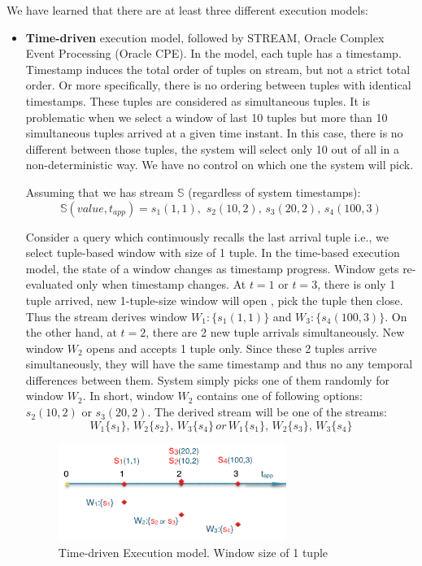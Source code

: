 We have learned that there are at least three different execution models:
\begin{itemize}
	\item \textbf{Time-driven} execution model, followed by STREAM, Oracle Complex Event Processing (Oracle CPE). In the model, each tuple has a timestamp. Timestamp induces the total order of tuples on stream, but not a strict total order. Or more specifically, there is no ordering between tuples with identical timestamps. These tuples are considered as simultaneous tuples. It is problematic when we select a window of last 10 tuples but more than 10 simultaneous tuples arrived at a given time instant. In this case, there is no different between those tuples, the system will select only 10 out of all in a non-deterministic way. We have no control on which one the system will pick.
	
Assuming that we has stream $\mathbb{S}$ (regardless of system timestamps): 
	\begin{equation}
			\mathbb{S}(value, t_{app}) = s_1(1,1),\,\,s_2(10,2),\,s_3(20,2),\, s_4(100,3)
	\end{equation}
	
	
Consider a query which continuously recalls the last arrival tuple i.e., we select tuple-based window with size of 1 tuple. In the time-based execution model,  the state of a window changes as timestamp progress. Window gets re-evaluated only when timestamp changes. At $t=1$ or $t=3$, there is only 1 tuple arrived, new 1-tuple-size window will open , pick the tuple then close. Thus the stream derives window $W_1: \{s_1(1,1)\}$ and $W_3: \{s_4(100,3)\}$. On the other hand, at $t=2$, there are 2 new tuple arrivals simultaneously. New window $W_2$ opens and accepts 1 tuple only. Since these 2 tuples arrive simultaneously, they will have the same timestamp and thus no any temporal differences between them. System simply picks one of them randomly for window $W_2$. In short, window $W_2$ contains one of following options: $s_2(10,2)$ or $s_3(20,2)$. The derived stream will be one of the streams:
\begin{equation}
W_1\{s_1\},\, W_2\{s_2\},\, W_3\{s_4\}\, \textit{or}\, W_1\{s_1\},\, W_2\{s_3\},\, W_3\{s_4\}
\end{equation}

\begin{figure}[htbp!] 
\centering    
\includegraphics[width=0.7\textwidth]{time-driven}
\caption[Time-driven Execution model]{Time-driven Execution model. Window size of 1 tuple}
\label{fig:time-driven}
\end{figure}
	

\end{itemize}
